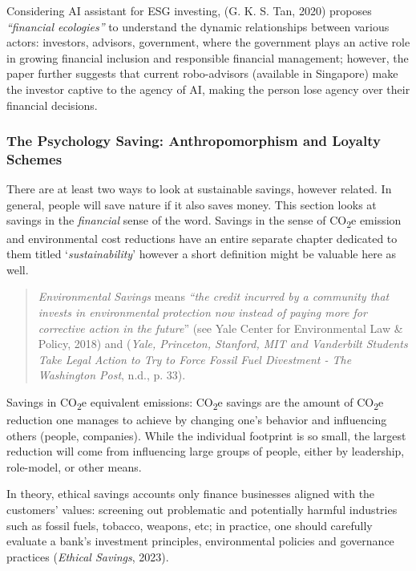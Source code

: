 \documentclass[
  12pt,
  letterpaper,
  DIV=11,
  numbers=noendperiod]{scrartcl}
\begin{document}
\let\pandoctableshortcapt\relax

Considering AI assistant for ESG investing, (G. K. S. Tan, 2020)
proposes \emph{``financial ecologies''} to understand the dynamic
relationships between various actors: investors, advisors, government,
where the government plays an active role in growing financial inclusion
and responsible financial management; however, the paper further
suggests that current robo-advisors (available in Singapore) make the
investor captive to the agency of AI, making the person lose agency over
their financial decisions.

\subsubsection{The Psychology Saving: Anthropomorphism and Loyalty
Schemes}\label{the-psychology-saving-anthropomorphism-and-loyalty-schemes}

There are at least two ways to look at sustainable savings, however
related. In general, people will save nature if it also saves money.
This section looks at savings in the \emph{financial} sense of the word.
Savings in the sense of CO\textsubscript{2}e emission and environmental
cost reductions have an entire separate chapter dedicated to them titled
`\emph{sustainability}' however a short definition might be valuable
here as well.

\begin{quote}
\emph{Environmental Savings} means \emph{``the credit incurred by a
community that invests in environmental protection now instead of paying
more for corrective action in the future}'' (see Yale Center for
Environmental Law \& Policy, 2018) and (\emph{Yale, {Princeton},
{Stanford}, {MIT} and {Vanderbilt} Students Take Legal Action to Try to
Force Fossil Fuel Divestment - {The Washington Post}}, n.d., p. 33).
\end{quote}

Savings in CO\textsubscript{2}e equivalent emissions:
CO\textsubscript{2}e savings are the amount of CO\textsubscript{2}e
reduction one manages to achieve by changing one's behavior and
influencing others (people, companies). While the individual footprint
is so small, the largest reduction will come from influencing large
groups of people, either by leadership, role-model, or other means.

In theory, ethical savings accounts only finance businesses aligned with
the customers' values: screening out problematic and potentially harmful
industries such as fossil fuels, tobacco, weapons, etc; in practice, one
should carefully evaluate a bank's investment principles, environmental
policies and governance practices (\emph{Ethical {Savings}}, 2023).
\end{document}
